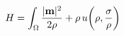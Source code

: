 \documentclass[preview]{standalone}
\begin{document}
\begin{align*}
\special{dvisvgm:raw <g id='unique000'>}H=\int_\Omega \frac{|\mathbf{m}|^{2}}{2\rho}+\rho\,u\!\left(\rho,\frac{\sigma}{\rho}\right)\special{dvisvgm:raw </g>}
\end{align*}
\end{document}
